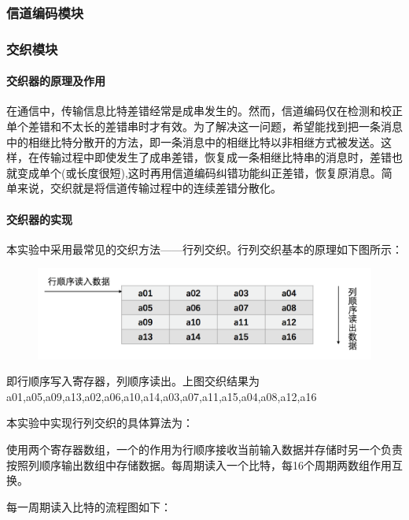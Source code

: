 \documentclass[UTF8]{ctexart}
\begin{document}
\subsubsection{信道编码模块}


\subsubsection{交织模块}

\paragraph{交织器的原理及作用}

在通信中，传输信息比特差错经常是成串发生的。然而，信道编码仅在检测和校正单个差错和不太长的差错串时才有效。为了解决这一问题，希望能找到把一条消息中的相继比特分散开的方法，即一条消息中的相继比特以非相继方式被发送。这样，在传输过程中即使发生了成串差错，恢复成一条相继比特串的消息时，差错也就变成单个(或长度很短),这时再用信道编码纠错功能纠正差错，恢复原消息。简单来说，交织就是将信道传输过程中的连续差错分散化。

\paragraph{交织器的实现}

本实验中采用最常见的交织方法——行列交织。行列交织基本的原理如下图所示：

\begin{figure}[H]
    \centering
    \includegraphics[width=\textwidth]{images//inter_input.png}
\end{figure}

即行顺序写入寄存器，列顺序读出。上图交织结果为a01,a05,a09,a13,a02,a06,a10,a14,a03,a07,a11,a15,a04,a08,a12,a16


本实验中实现行列交织的具体算法为：

使用两个寄存器数组，一个的作用为行顺序接收当前输入数据并存储时另一个负责按照列顺序输出数组中存储数据。每周期读入一个比特，每16个周期两数组作用互换。

每一周期读入比特的流程图如下：
\end{document}
